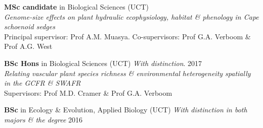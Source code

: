 \begin{hangparas}{2em}{1}

\textbf{MSc candidate} in Biological Sciences {\small (UCT)}              \\
\hspace{2em} \textit{Genome-size effects on plant
  hydraulic ecophysiology, habitat \& phenology in
  Cape schoenoid sedges}                                                  \\
\hspace{2em} Principal supervisor: Prof A.M. Muasya.
  Co-supervisors:
  Prof G.A. Verboom \&
  Prof A.G. West

\textbf{BSc Hons} in Biological Sciences {\small
  (UCT) \textit{With distinction}}.                  \hfill {\small 2017} \\
\hspace{2em} \textit{Relating vascular plant species
  richness \& environmental heterogeneity spatially
  in the GCFR \& SWAFR}                                                   \\
\hspace{2em} Supervisors:
  Prof M.D. Cramer \&
  Prof G.A. Verboom

\textbf{BSc} in Ecology \& Evolution, Applied
  Biology {\small (UCT) \textit{With distinction in
  both majors \& the degree}}                        \hfill {\small 2016}

\end{hangparas}
